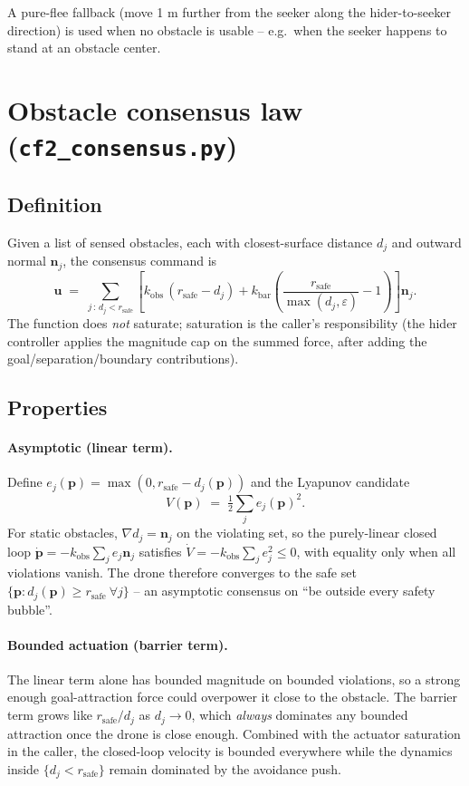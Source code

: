 \documentclass[11pt,a4paper]{article}
\newcommand{\code}[1]{\texttt{#1}}
\newcommand{\vect}[1]{\mathbf{#1}}
\begin{document}
A pure-flee fallback (move 1 m further from the seeker along the
hider-to-seeker direction) is used when no obstacle is usable -- e.g.\ when
the seeker happens to stand at an obstacle center.

\section{Obstacle consensus law (\code{cf2\_consensus.py})}
\label{sec:consensus}

\subsection{Definition}

Given a list of sensed obstacles, each with closest-surface distance $d_j$ and
outward normal $\vect{n}_j$, the consensus command is
\[
    \vect{u} \;=\; \sum_{j \,:\, d_j < r_\mathrm{safe}} \left[
                       k_\mathrm{obs}\,(r_\mathrm{safe} - d_j)
                     + k_\mathrm{bar}\!\left(\frac{r_\mathrm{safe}}{\max(d_j,\varepsilon)} - 1\right)
                   \right] \vect{n}_j.
\]
The function does \emph{not} saturate; saturation is the caller's
responsibility (the hider controller applies the magnitude cap on the summed
force, after adding the goal/separation/boundary contributions).

\subsection{Properties}

\paragraph{Asymptotic (linear term).}
Define $e_j(\vect{p}) = \max(0, r_\mathrm{safe} - d_j(\vect{p}))$ and the
Lyapunov candidate
\[
    V(\vect{p}) \;=\; \tfrac{1}{2} \sum_j e_j(\vect{p})^2.
\]
For static obstacles, $\nabla d_j = \vect{n}_j$ on the violating set, so the
purely-linear closed loop $\dot{\vect{p}} = -k_\mathrm{obs}\sum_j e_j \vect{n}_j$
satisfies $\dot{V} = -k_\mathrm{obs}\sum_j e_j^2 \le 0$, with equality only when
all violations vanish. The drone therefore converges to the safe set $\{\vect{p}
: d_j(\vect{p}) \ge r_\mathrm{safe}\ \forall j\}$ -- an asymptotic consensus on
``be outside every safety bubble''.

\paragraph{Bounded actuation (barrier term).}
The linear term alone has bounded magnitude on bounded violations, so a
strong enough goal-attraction force could overpower it close to the obstacle.
The barrier term grows like $r_\mathrm{safe}/d_j$ as $d_j \to 0$, which
\emph{always} dominates any bounded attraction once the drone is close enough.
Combined with the actuator saturation in the caller, the closed-loop velocity
is bounded everywhere while the dynamics inside $\{d_j < r_\mathrm{safe}\}$
remain dominated by the avoidance push.
\end{document}
